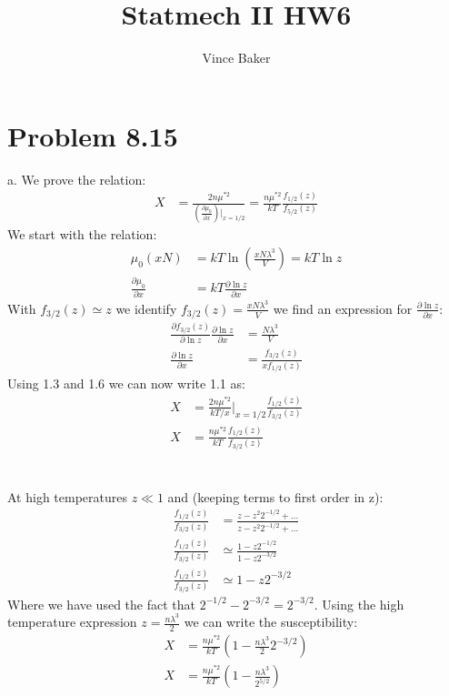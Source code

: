 \documentclass[a4paper,11pt]{article}
\title{Statmech II HW6}
\author{Vince Baker}
\numberwithin{equation}{section}
\begin{document}
\maketitle

\section{Problem 8.15}
a. We prove the relation:
\begin{align}
 X &= \frac{2n\mu^{*2}}{(\frac{\partial \mu_0}{\partial x})|_{x=1/2}} = \frac{n\mu^{*2}}{kT}\frac{f_{1/2}(z)}{f_{5/2}(z)}
\end{align}
We start with the relation:
\begin{align}
 \mu_0(xN) &= kT\ln{(\frac{xN\lambda^3}{V})} = kT\ln{z}\\
 \frac{\partial{\mu_0}}{\partial x} &= kT\frac{\partial \ln{z}}{\partial x}
\end{align}
With $f_{3/2}(z) \simeq z$ we identify $f_{3/2}(z) = \frac{xN\lambda^3}{V}$ we find an expression for $\frac{\partial \ln{z}}{\partial x}$:
\begin{align}
 \frac{\partial f_{3/2}(z)}{\partial \ln{z}}\frac{\partial \ln{z} }{\partial x} &= \frac{N\lambda^3}{V}\\
 \frac{\partial \ln{z}}{\partial x} &= \frac{f_{3/2}(z)}{xf_{1/2}(z)}
\end{align}
Using 1.3 and 1.6 we can now write 1.1 as:
\begin{align}
 X &= \frac{2n\mu^{*2}}{kT/x}|_{x=1/2}\frac{f_{1/2}(z)}{f_{3/2}(z)}\\
 X &= \frac{n\mu^{*2}}{kT}\frac{f_{1/2}(z)}{f_{3/2}(z)}
\end{align}
\\ \\
At high temperatures $z \ll 1$ and (keeping terms to first order in z):
\begin{align}
 \frac{f_{1/2}(z)}{f_{3/2}(z)} &= \frac{z-z^2 2^{-1/2}+...}{z-z^2 2^{-1/2}+...}\\
 \frac{f_{1/2}(z)}{f_{3/2}(z)} &\simeq \frac{1-z2^{-1/2}}{1-z2^{-3/2}}\\
 \frac{f_{1/2}(z)}{f_{3/2}(z)} &\simeq 1-z2^{-3/2}
\end{align}
Where we have used the fact that $2^{-1/2}-2^{-3/2}=2^{-3/2}$.
Using the high temperature expression $z=\frac{n\lambda^3}{2}$ we can write the susceptibility:
\begin{align}
 X &= \frac{n\mu^{*2}}{kT}\left(1-\frac{n\lambda^3}{2}2^{-3/2} \right)\\
 X &= \frac{n\mu^{*2}}{kT}\left(1-\frac{n\lambda^3}{2^{5/2}} \right)
\end{align}
\end{document}
